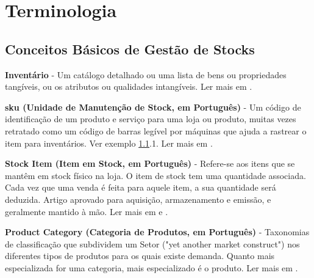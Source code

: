 %
%
\chapter{Terminologia} \label{a1}

%
%
\section{Conceitos Básicos de Gestão de Stocks} \label{seca11}

\vspace{0.2cm}
\textbf{Inventário} - Um catálogo detalhado ou uma lista de bens ou propriedades tangíveis, ou os atributos ou qualidades intangíveis. Ler mais em \cite{businessDictionary:invetoryDefinition2018}.

\vspace{0.2cm}
\textbf{\acrfull{sku} (Unidade de Manutenção de Stock, em Português)} - Um código de identificação de um produto e serviço para uma loja ou produto, muitas vezes retratado como um código de barras legível por máquinas que ajuda a rastrear o item para inventários. Ver exemplo \ref{seca11}.1. Ler mais em \cite{investopedia:skuDefinition2018}.

\noindent{}

\vspace{0.2cm}
\textbf{Stock Item (Item em Stock, em Português)} - Refere-se aos itens que se mantêm em stock físico na loja. O item de stock tem uma quantidade associada. Cada vez que uma venda é feita para aquele item, a sua quantidade será deduzida. 
Artigo aprovado para aquisição, armazenamento e emissão, e geralmente mantido à mão. Ler mais em \cite{businessDictionary:stockItemDefinition2018} e \cite{phostersoft:stockItemDefinition2018}.


\vspace{0.2cm}
\textbf{Product Category (Categoria de Produtos, em Português)} - Taxonomias de classificação que subdividem um Setor ("yet another market construct") nos diferentes tipos de produtos para os quais existe demanda. Quanto mais especializada for uma categoria, mais especializado é o produto. Ler mais em \cite{sphereoi:itemIdentification2018}.

